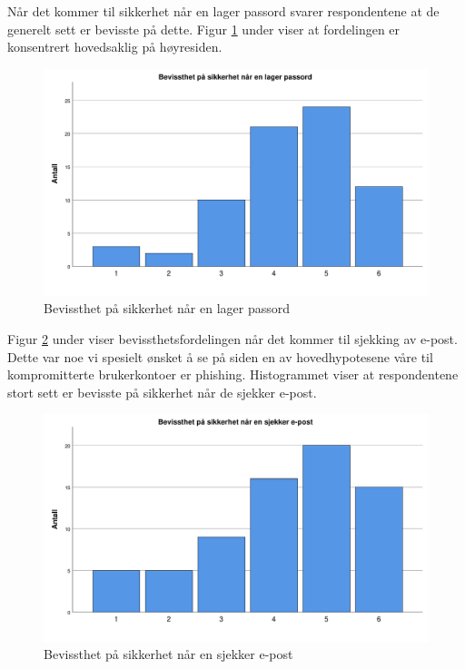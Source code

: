 Når det kommer til sikkerhet når en lager passord svarer respondentene at de generelt sett er bevisste på dette. Figur \ref{fig:bevisst-passord} under viser at fordelingen er konsentrert hovedsaklig på høyresiden.
\begin{figure}[H]
    \centering
    \includegraphics[scale=0.5]{case_2/bilder/spss/bevisst_passord.pdf}
    \caption[bevisst-passord]{Bevissthet på sikkerhet når en lager passord}
    \label{fig:bevisst-passord}
\end{figure}

Figur \ref{fig:bevisst-e-post} under viser bevissthetsfordelingen når det kommer til sjekking av e-post. Dette var noe vi spesielt ønsket å se på siden en av hovedhypotesene våre til kompromitterte brukerkontoer er phishing. Histogrammet viser at respondentene stort sett er bevisste på sikkerhet når de sjekker e-post.
\begin{figure}[H]
    \centering
    \includegraphics[scale=0.5]{case_2/bilder/spss/bevisst_e-post.pdf}
    \caption[bevisst-e-post]{Bevissthet på sikkerhet når en sjekker e-post}
    \label{fig:bevisst-e-post}
\end{figure}

